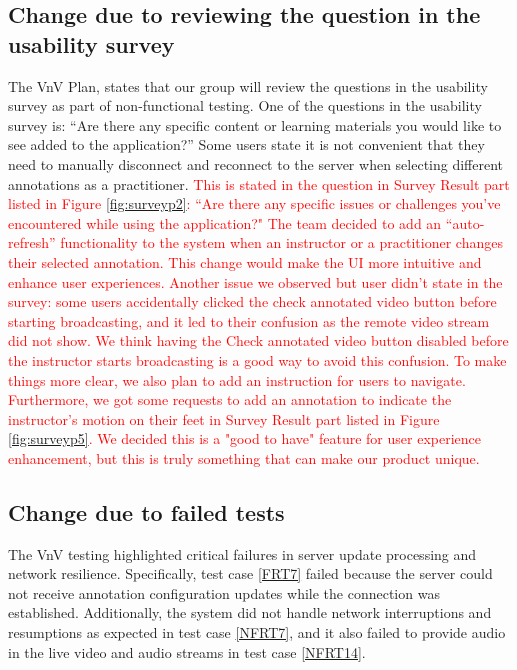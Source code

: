 \documentclass[12pt, titlepage]{article}
\newcommand{\rt}[1]{\textcolor{red}{#1}}
\begin{document}
\subsection{Change due to reviewing the question in the usability survey}

The VnV Plan, states that our group will review the questions in the usability
survey as part of non-functional testing. One of the questions in the usability
survey is: “Are there any specific content or learning materials you would like
to see added to the application?” Some users state it is not convenient that
they need to manually disconnect and reconnect to the server when selecting
different annotations as a practitioner. \rt{This is stated in the question in
  Survey Result part listed in Figure \ref{fig:surveyp2}: ``Are there any specific issues or
  challenges you've encountered while using the application?" The team decided
  to add an “auto-refresh” functionality to the system when an instructor or a
  practitioner changes their selected annotation. This change would make the UI
  more intuitive and enhance user experiences. Another issue we observed but
  user didn't state in the survey: some users accidentally clicked the check
  annotated video button before starting broadcasting, and it led to their
  confusion as the remote video stream did not show. We think having the Check
  annotated video button disabled before the instructor starts broadcasting is a
  good way to avoid this confusion. To make things more clear, we also plan to
  add an instruction for users to navigate. Furthermore, we got some requests to
  add an annotation to indicate the instructor's motion on their feet in
  Survey Result part listed in Figure \ref{fig:surveyp5}. We decided this is a "good to have"
  feature for user experience enhancement, but this is truly something that can
  make our product unique. }

\subsection{Change due to failed tests}

The VnV testing highlighted critical failures in server update processing and
network resilience. Specifically, test case \ref{FRT7} failed because the server
could not receive annotation configuration updates while the connection was
established. Additionally, the system did not handle network interruptions and
resumptions as expected in test case \ref{NFRT7}, and it also failed to provide
audio in the live video and audio streams in test case \ref{NFRT14}.
\end{document}
